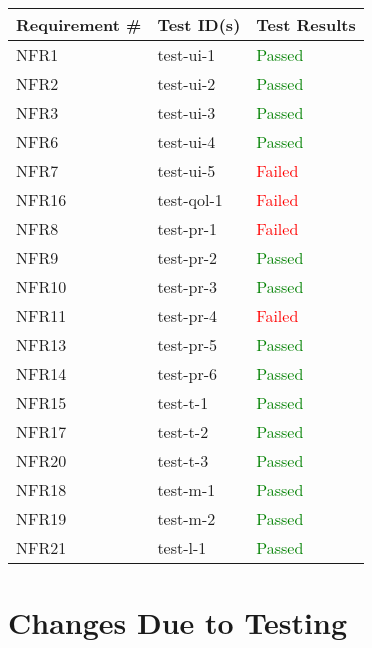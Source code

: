 \documentclass[12pt, titlepage]{article}
\begin{document}
\newpage
  \begin{table}[h!]
	
	\begin{tabular}{|p{3.5cm}|p{6.5cm}|p{4.5cm}|}

	\hline
	\textbf{Requirement \#} & \textbf{Test ID(s)}   &\textbf{Test Results}  \\ \hline
	NFR1 & test-ui-1 & \textcolor{green}{Passed} \\ \hline
	NFR2 & test-ui-2 & \textcolor{green}{Passed}   \\ \hline
	NFR3 & test-ui-3 & \textcolor{green}{Passed} \\ \hline
	NFR6 & test-ui-4 & \textcolor{green}{Passed} \\ \hline
	NFR7 & test-ui-5 & \textcolor{red}{Failed}  \\ \hline
	NFR16 & test-qol-1 & \textcolor{red}{Failed} \\ \hline
	NFR8 & test-pr-1 & \textcolor{red}{Failed}  \\ \hline
	NFR9 & test-pr-2 & \textcolor{green}{Passed} \\ \hline
	NFR10 & test-pr-3 & \textcolor{green}{Passed}\\ \hline
	NFR11 & test-pr-4 & \textcolor{red}{Failed} \\ \hline
	NFR13 & test-pr-5 & \textcolor{green}{Passed}\\ \hline
	NFR14 & test-pr-6 & \textcolor{green}{Passed}\\ \hline
	NFR15 & test-t-1 & \textcolor{green}{Passed}\\ \hline
	NFR17 & test-t-2 & \textcolor{green}{Passed}\\ \hline
	NFR20 & test-t-3 & \textcolor{green}{Passed}\\ \hline
	NFR18 & test-m-1 & \textcolor{green}{Passed}\\ \hline
	NFR19 & test-m-2 & \textcolor{green}{Passed}\\ \hline
	NFR21 & test-l-1 & \textcolor{green}{Passed}\\ \hline	
\end{tabular}
	
  \end{table}

\newpage

\section{Changes Due to Testing}

\newpage
		
\end{document}
